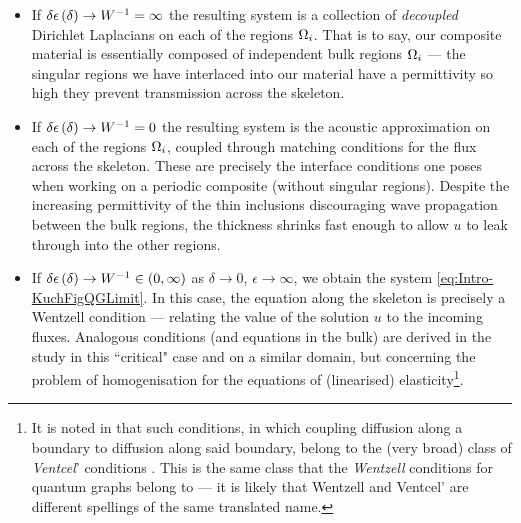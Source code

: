 \begin{itemize}
	\item If $\delta\epsilon\left( \delta \right)\rightarrow W^{-1}=\infty$ the resulting system is a collection of \emph{decoupled} Dirichlet Laplacians on each of the regions $\Omega_i$.
	That is to say, our composite material is essentially composed of independent bulk regions $\Omega_i$ --- the singular regions we have interlaced into our material have a permittivity so high they prevent transmission across the skeleton.
	\item If $\delta\epsilon\left( \delta \right)\rightarrow W^{-1}=0$ the resulting system is the acoustic approximation on each of the regions $\Omega_i$, coupled through matching conditions for the flux across the skeleton.
	These are precisely the interface conditions one poses when working on a periodic composite (without singular regions).
	Despite the increasing permittivity of the thin inclusions discouraging wave propagation between the bulk regions, the thickness shrinks fast enough to allow $u$ to leak through into the other regions.
	\item If $\delta\epsilon\left( \delta \right)\rightarrow W^{-1}\in\left( 0,\infty \right)$ as $\delta\rightarrow0$, $\epsilon\rightarrow\infty$, we obtain the system \eqref{eq:Intro-KuchFigQGLimit}.
	In this case, the equation along the skeleton is precisely a Wentzell condition --- relating the value of the solution $u$ to the incoming fluxes.
	Analogous conditions (and equations in the bulk) are derived in the study \cite{cherednichenko2019homogenisation} in this ``critical" case and on a similar domain, but concerning the problem of homogenisation for the equations of (linearised) elasticity\footnote{It is noted in \cite{cherednichenko2019homogenisation} that such conditions, in which coupling diffusion along a boundary to diffusion along said boundary, belong to the (very broad) class of \emph{Ventcel}' conditions \cite{venttsel1959boundary}. This is the same class that the \emph{Wentzell} conditions for quantum graphs belong to --- it is likely that Wentzell and Ventcel' are different spellings of the same translated name.}.
\end{itemize}

